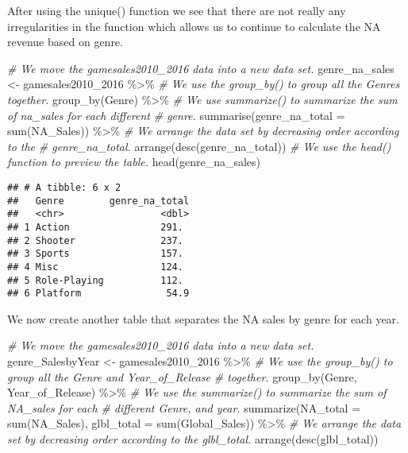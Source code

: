 \documentclass[
]{article}
\newenvironment{Shaded}{\begin{snugshade}}{\end{snugshade}}
\newcommand{\AttributeTok}[1]{\textcolor[rgb]{0.77,0.63,0.00}{#1}}
\newcommand{\CommentTok}[1]{\textcolor[rgb]{0.56,0.35,0.01}{\textit{#1}}}
\newcommand{\FunctionTok}[1]{\textcolor[rgb]{0.00,0.00,0.00}{#1}}
\newcommand{\NormalTok}[1]{#1}
\newcommand{\OtherTok}[1]{\textcolor[rgb]{0.56,0.35,0.01}{#1}}
\newcommand{\SpecialCharTok}[1]{\textcolor[rgb]{0.00,0.00,0.00}{#1}}
\begin{document}
After using the unique() function we see that there are not really any
irregularities in the function which allows us to continue to calculate
the NA revenue based on genre.

\begin{Shaded}
\begin{Highlighting}[]
\CommentTok{\# We move the gamesales2010\_2016 data into a new data set.}
\NormalTok{genre\_na\_sales }\OtherTok{\textless{}{-}}\NormalTok{ gamesales2010\_2016 }\SpecialCharTok{\%\textgreater{}\%}
    \CommentTok{\# We use the group\_by() to group all the Genres together.}
\FunctionTok{group\_by}\NormalTok{(Genre) }\SpecialCharTok{\%\textgreater{}\%}
    \CommentTok{\# We use summarize() to summarize the sum of na\_sales for each different}
    \CommentTok{\# genre.}
\FunctionTok{summarise}\NormalTok{(}\AttributeTok{genre\_na\_total =} \FunctionTok{sum}\NormalTok{(NA\_Sales)) }\SpecialCharTok{\%\textgreater{}\%}
    \CommentTok{\# We arrange the data set by decreasing order according to the}
    \CommentTok{\# genre\_na\_total.}
\FunctionTok{arrange}\NormalTok{(}\FunctionTok{desc}\NormalTok{(genre\_na\_total))}
\CommentTok{\# We use the head() function to preview the table.}
\FunctionTok{head}\NormalTok{(genre\_na\_sales)}
\end{Highlighting}
\end{Shaded}

\begin{verbatim}
## # A tibble: 6 x 2
##   Genre        genre_na_total
##   <chr>                 <dbl>
## 1 Action                291. 
## 2 Shooter               237. 
## 3 Sports                157. 
## 4 Misc                  124. 
## 5 Role-Playing          112. 
## 6 Platform               54.9
\end{verbatim}

We now create another table that separates the NA sales by genre for
each year.

\begin{Shaded}
\begin{Highlighting}[]
\CommentTok{\# We move the gamesales2010\_2016 data into a new data set.}
\NormalTok{genre\_SalesbyYear }\OtherTok{\textless{}{-}}\NormalTok{ gamesales2010\_2016 }\SpecialCharTok{\%\textgreater{}\%}
    \CommentTok{\# We use the group\_by() to group all the Genre and Year\_of\_Release}
    \CommentTok{\# together.}
\FunctionTok{group\_by}\NormalTok{(Genre, Year\_of\_Release) }\SpecialCharTok{\%\textgreater{}\%}
    \CommentTok{\# We use the summarize() to summarize the sum of NA\_sales for each}
    \CommentTok{\# different Genre, and year.}
\FunctionTok{summarize}\NormalTok{(}\AttributeTok{NA\_total =} \FunctionTok{sum}\NormalTok{(NA\_Sales), }\AttributeTok{glbl\_total =} \FunctionTok{sum}\NormalTok{(Global\_Sales)) }\SpecialCharTok{\%\textgreater{}\%}
    \CommentTok{\# We arrange the data set by decreasing order according to the glbl\_total.}
\FunctionTok{arrange}\NormalTok{(}\FunctionTok{desc}\NormalTok{(glbl\_total))}
\end{Highlighting}
\end{Shaded}
\end{document}
